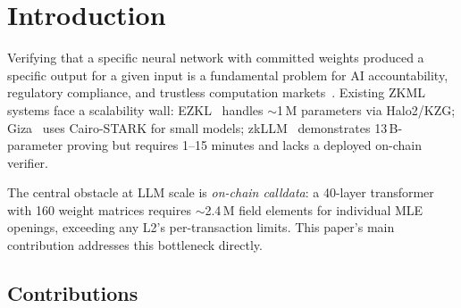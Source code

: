 \documentclass[10pt,twocolumn]{article}
\theoremstyle{definition}
\theoremstyle{remark}
\begin{document}
\section{Introduction}\label{sec:intro}

Verifying that a specific neural network with committed weights produced a
specific output for a given input is a fundamental problem for AI
accountability, regulatory compliance, and trustless computation
markets~\cite{kang2022scaling, sun2024zkllm}.
Existing ZKML systems face a scalability wall:
EZKL~\cite{ezkl2024} handles $\sim$1\,M parameters via Halo2/KZG;
Giza~\cite{giza2024} uses Cairo-STARK for small models;
zkLLM~\cite{sun2024zkllm} demonstrates 13\,B-parameter proving but
requires 1--15 minutes and lacks a deployed on-chain verifier.

The central obstacle at LLM scale is \emph{on-chain calldata}:
a 40-layer transformer with 160 weight matrices requires
$\sim$2.4\,M field elements for individual MLE openings,
exceeding any L2's per-transaction limits.
This paper's main contribution addresses this bottleneck directly.

\subsection{Contributions}
\end{document}
